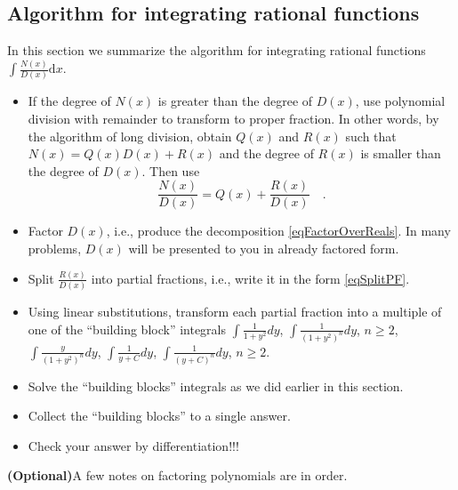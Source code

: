 \documentclass[12pt]{book}
\newcommand{\diff}{\text{d}}
\newcommand{\optionalMaterial}{\textbf{(Optional)}}
\begin{document}
\subsection{Algorithm for integrating rational functions}
In this section we summarize the algorithm for integrating rational functions $\int \frac{N(x)}{D(x)}\diff x$.
\begin{itemize}
\item If the degree of $N(x)$ is greater than the degree of $D(x)$, use polynomial division with remainder to transform to proper fraction. In other words, by the algorithm of long division, obtain $Q(x)$ and $R(x)$ such that $N(x)= Q(x)D(x)+R(x)$ and the degree of $R(x)$ is smaller than the degree of $D(x)$. Then use 
\[
\frac{N(x)}{D(x)}=Q(x) +\frac{R(x)}{D(x)}\quad .
\]
\item Factor $D(x)$, i.e., produce the decomposition \eqref{eqFactorOverReals}. In many problems, $D(x)$ will be presented to you in already factored form.
\item Split $\frac{R(x)}{D(x)}$ into partial fractions, i.e., write it in the form \eqref{eqSplitPF}. 
\item Using linear substitutions, transform each partial fraction into a multiple of one of the ``building block'' integrals  $\int \frac{1}{1+y^2}dy$, $\int \frac{1}{(1+y^2)^n}dy$, $n\geq 2$, $\int \frac{y}{(1+y^2)^n}dy$, $\int \frac{1}{y+C}dy$, $\int \frac{1}{(y+C)^n}dy$, $n\geq 2$.
\item Solve the ``building blocks'' integrals as we did earlier in this section.
\item Collect the ``building blocks'' to a single answer.
\item Check your answer by differentiation!!!
\end{itemize}
\optionalMaterial A few notes on factoring polynomials are in order. 
\end{document}
